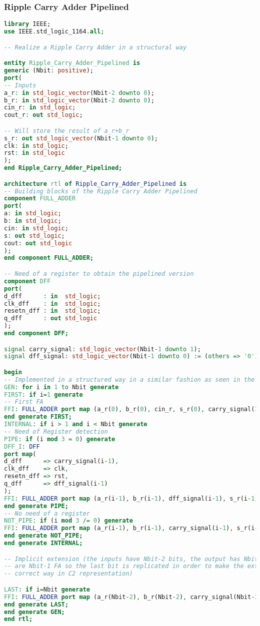 \subsubsection{Ripple Carry Adder Pipelined}
\begin{lstlisting}[language=VHDL]
library IEEE;
use IEEE.std_logic_1164.all;

-- Realize a Ripple Carry Adder in a structural way

entity Ripple_Carry_Adder_Pipelined is
generic (Nbit: positive);
port(
-- Inputs
a_r: in std_logic_vector(Nbit-2 downto 0);
b_r: in std_logic_vector(Nbit-2 downto 0);
cin_r: in std_logic;
cout_r: out std_logic;

-- Will store the result of a_r+b_r
s_r: out std_logic_vector(Nbit-1 downto 0);
clk: in std_logic;
rst: in std_logic
);
end Ripple_Carry_Adder_Pipelined;

architecture rtl of Ripple_Carry_Adder_Pipelined is 
-- Building blocks of the Ripple Carry Adder Pipelined 
component FULL_ADDER
port(
a: in std_logic;
b: in std_logic;
cin: in std_logic;
s: out std_logic;
cout: out std_logic
);
end component FULL_ADDER;

-- Need of a register to obtain the pipelined version
component DFF
port(
d_dff      : in  std_logic;
clk_dff    : in  std_logic;
resetn_dff : in  std_logic;
q_dff      : out std_logic
);
end component DFF;

signal carry_signal: std_logic_vector(Nbit-1 downto 1);
signal dff_signal: std_logic_vector(Nbit-1 downto 0) := (others => '0');

begin
-- Implemented in a structured way in a similar fashion as seen in the Lab lessions
GEN: for i in 1 to Nbit generate
FIRST: if i=1 generate
-- First FA
FFI: FULL_ADDER port map (a_r(0), b_r(0), cin_r, s_r(0), carry_signal(1));
end generate FIRST;
INTERNAL: if i > 1 and i < Nbit generate
-- Need of Register detection
PIPE: if (i mod 3 = 0) generate
DFF_I: DFF
port map(
d_dff      => carry_signal(i-1),
clk_dff    => clk,
resetn_dff => rst,
q_dff      => dff_signal(i-1)
);
FFI: FULL_ADDER port map (a_r(i-1), b_r(i-1), dff_signal(i-1), s_r(i-1), carry_signal(i));
end generate PIPE;
-- No need of a register
NOT_PIPE: if (i mod 3 /= 0) generate
FFI: FULL_ADDER port map (a_r(i-1), b_r(i-1), carry_signal(i-1), s_r(i-1), carry_signal(i));
end generate NOT_PIPE;           
end generate INTERNAL;

-- Implicit extension (the inputs have Nbit-2 bits, the output has Nbit-1 bits and there
-- are Nbit-1 FA so the last bit is replicated in order to make the extension in the 
-- correct way in C2 representation)

LAST: if i=Nbit generate
FFI: FULL_ADDER port map (a_r(Nbit-2), b_r(Nbit-2), carry_signal(Nbit-1), s_r(Nbit-1), cout_r);
end generate LAST;
end generate GEN;
end rtl;

\end{lstlisting}

